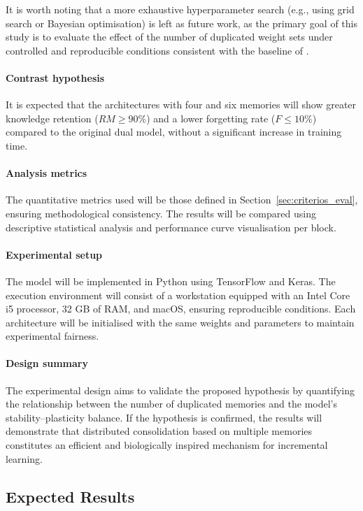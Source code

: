 \noindent It is worth noting that a more exhaustive hyperparameter search (e.g., 
using grid search or Bayesian optimisation) is left as future work, as the primary 
goal of this study is to evaluate the effect of the number of duplicated weight sets 
under controlled and reproducible conditions consistent with the baseline of 
\cite{bullinaria2009}.

\paragraph{Contrast hypothesis}
It is expected that the architectures with four and six memories will show greater knowledge retention (\(RM \geq 90\%\)) and a lower forgetting rate (\(F \leq 10\%\)) compared to the original dual model, without a significant increase in training time.

\paragraph{Analysis metrics}
The quantitative metrics used will be those defined in Section~\ref{sec:criterios_eval}, ensuring methodological consistency.  
The results will be compared using descriptive statistical analysis and performance curve visualisation per block.

\paragraph{Experimental setup}
The model will be implemented in Python using TensorFlow and Keras.  
The execution environment will consist of a workstation equipped with an Intel Core i5 processor, 32 GB of RAM, and macOS, ensuring reproducible conditions.  
Each architecture will be initialised with the same weights and parameters to maintain experimental fairness.

\paragraph{Design summary}
The experimental design aims to validate the proposed hypothesis by quantifying the relationship between the number of duplicated memories and the model’s stability–plasticity balance.  
If the hypothesis is confirmed, the results will demonstrate that distributed consolidation based on multiple memories constitutes an efficient and biologically inspired mechanism for incremental learning.

\subsection{Expected Results}

